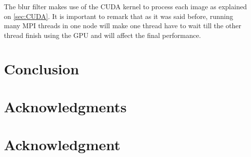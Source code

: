 \documentclass[conference,compsoc]{IEEEtran}
\begin{document}
The blur filter makes use of the CUDA kernel to process each image as explained on \ref{sec:CUDA}. It is important to remark that as it was said before, running many MPI threads in one node will make one thread have to wait till the other thread finish using the GPU and will affect the final performance.

\section{Conclusion}

\ifCLASSOPTIONcompsoc
  \section*{Acknowledgments}
\else
  \section*{Acknowledgment}
\fi

\newpage
{}


\end{document}
